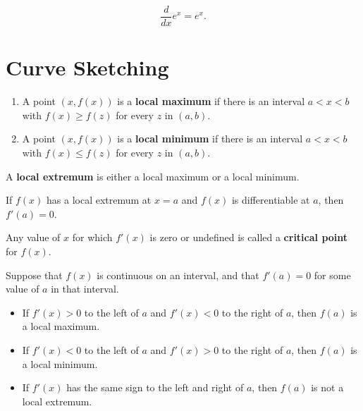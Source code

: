\documentclass{ximera}
\newcommand{\ddx}{\frac{d}{dx}}
\begin{document}
\begin{theorem}
\[
\ddx e^x = e^x.
\]
\end{theorem}







\section*{Curve Sketching}





\begin{definition}\hfil
\begin{enumerate}
\item A point $(x,f(x))$ is a \textbf{local maximum} if there is an interval $a<x<b$ with $f(x)\ge f(z)$ for
every $z$ in $(a,b)$.
\item A point $(x,f(x))$ is a \textbf{local minimum} if
there is an interval $a<x<b$ with $f(x)\le f(z)$ for every $z$ in
$(a,b)$.
\end{enumerate}
A \textbf{local extremum} is either a local
maximum or a local minimum.
\end{definition}



\begin{theorem}
If $f(x)$ has a local extremum at $x=a$ and $f(x)$ is differentiable
at $a$, then $f'(a)=0$.
\end{theorem}



\begin{definition}
Any value of $x$ for which $f'(x)$ is zero or undefined is called a
\textbf{critical point} for $f(x)$.
\end{definition}



\begin{theorem}\label{T:fdt}\hfil
Suppose that $f(x)$ is continuous on an interval, and that $f'(a)=0$
for some value of $a$ in that interval.
\begin{itemize}
\item If $f'(x)>0$ to the left of $a$ and $f'(x)<0$ to the right of
$a$, then $f(a)$ is a local maximum.
\item If $f'(x)<0$ to the left of $a$ and $f'(x)>0$ to the right of
$a$, then $f(a)$ is a local minimum.
\item If $f'(x)$ has the same sign to the left and right of $a$,
then $f(a)$ is not a local extremum.
\end{itemize}
\end{theorem}
\end{document}
